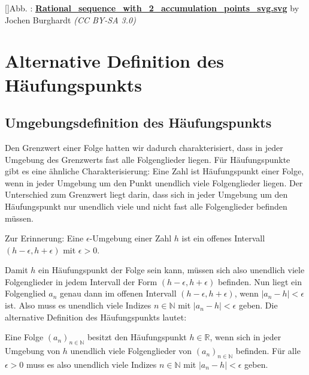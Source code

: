 \documentclass[fontsize=9pt,
               parskip=half-,
               DIV=14,
               listof=chapterentry,
               tocflat]{scrbook}
\newcounter{imagelabel}
\begin{document}
[]{Abb. : \protect\href{https://commons.wikimedia.org/wiki/File:Rational_sequence_with_2_accumulation_points_svg.svg}{\textbf{Rational\allowbreak\_sequence\allowbreak\_with\allowbreak\_2\allowbreak\_accumulation\allowbreak\_points\allowbreak\_svg.svg}} by Jochen Burghardt \textit{(CC BY-SA 3.0)}}\begin{center}
\end{center}

\section{Alternative Definition des Häufungspunkts}

\subsection{Umgebungsdefinition des Häufungspunkts}

Den Grenzwert einer Folge hatten wir dadurch charakterisiert, dass in jeder Umgebung des Grenzwerts fast alle Folgenglieder liegen. Für Häufungspunkte gibt es eine ähnliche Charakterisierung: Eine Zahl ist Häufungspunkt einer Folge, wenn in jeder Umgebung um den Punkt unendlich viele Folgenglieder liegen. Der Unterschied zum Grenzwert liegt darin, dass sich in jeder Umgebung um den Häufungspunkt nur unendlich viele und nicht fast alle Folgenglieder befinden müssen.

Zur Erinnerung: Eine $\epsilon $-Umgebung einer Zahl $h$ ist ein offenes Intervall $(h-\epsilon ,h+\epsilon )$ mit $\epsilon >0$.

Damit $h$ ein Häufungspunkt der Folge sein kann, müssen sich also unendlich viele Folgenglieder in jedem Intervall der Form $(h-\epsilon ,h+\epsilon )$ befinden. Nun liegt ein Folgenglied $a_{n}$ genau dann im offenen Intervall $(h-\epsilon ,h+\epsilon )$, wenn $|a_{n}-h|<\epsilon $ ist. Also muss es unendlich viele Indizes $n\in \mathbb {N} $ mit $|a_{n}-h|<\epsilon $ geben. Die alternative Definition des Häufungspunkts lautet:

\begin{definition*}
Eine Folge $(a_{n})_{n\in \mathbb {N} }$ besitzt den Häufungspunkt $h\in \mathbb {R} $, wenn sich in jeder Umgebung von $h$ unendlich viele Folgenglieder von $(a_{n})_{n\in \mathbb {N} }$ befinden. Für alle $\epsilon >0$ muss es also unendlich viele Indizes $n\in \mathbb {N} $ mit $|a_{n}-h|<\epsilon $ geben.

\end{definition*}
\end{document}
